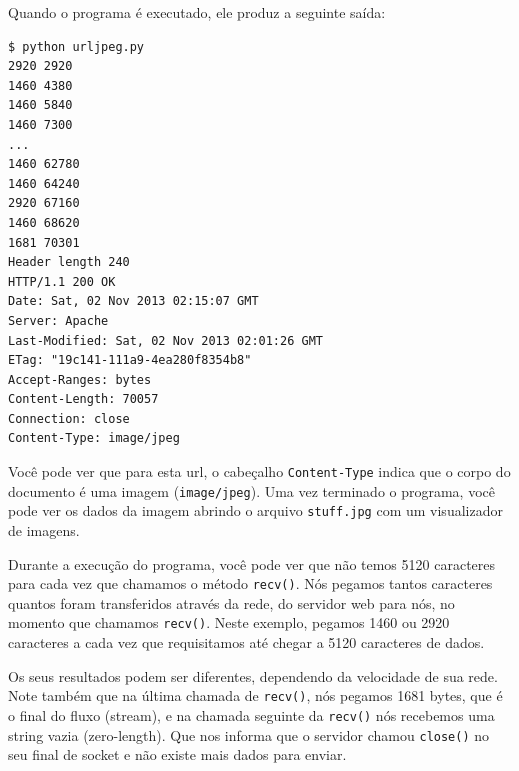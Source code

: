 Quando o programa é executado, ele produz a seguinte saída:

\beforeverb
\begin{verbatim}
$ python urljpeg.py 
2920 2920
1460 4380
1460 5840
1460 7300
...
1460 62780
1460 64240
2920 67160
1460 68620
1681 70301
Header length 240
HTTP/1.1 200 OK
Date: Sat, 02 Nov 2013 02:15:07 GMT
Server: Apache
Last-Modified: Sat, 02 Nov 2013 02:01:26 GMT
ETag: "19c141-111a9-4ea280f8354b8"
Accept-Ranges: bytes
Content-Length: 70057
Connection: close
Content-Type: image/jpeg
\end{verbatim}
\afterverb

Você pode ver que para esta url, o cabeçalho {\tt Content-Type} indica que o
corpo do documento é uma imagem ({\tt image/jpeg}). Uma vez terminado o
programa, você pode ver os dados da imagem abrindo o arquivo {\tt stuff.jpg}
com um visualizador de imagens.

Durante a execução do programa, você pode ver que não temos 5120 caracteres
para cada vez que chamamos o método {\tt recv()}. Nós pegamos tantos
caracteres quantos foram transferidos através da rede, do servidor web para
nós, no momento que chamamos {\tt recv()}.  Neste exemplo, pegamos 1460 ou 2920
caracteres a cada vez que requisitamos até chegar a 5120 caracteres de dados.

Os seus resultados podem ser diferentes, dependendo da velocidade de
sua rede.  Note também que na última chamada de {\tt recv()}, nós pegamos
1681 bytes, que é o final do fluxo (stream), e na chamada seguinte da
{\tt recv()} nós recebemos uma string vazia (zero-length). Que nos informa
que o servidor chamou {\tt close()} no seu final de socket e não existe mais
dados para enviar.

